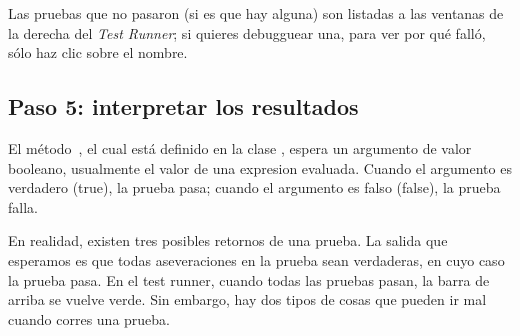 \documentclass[a4paper,10pt,twoside]{book}
\begin{document}




Las pruebas que no pasaron (si es que hay alguna) son listadas a las ventanas de la derecha del \emph{Test Runner};
si quieres debugguear una, para ver por qu\'e fall\'o, s\'olo haz clic sobre el nombre.


\subsection{Paso 5: interpretar los resultados}

El m\'etodo \,, el cual est\'a definido en la clase
, espera un argumento de valor booleano, usualmente el valor de 
una expresion evaluada. Cuando el argumento es verdadero (true), la prueba pasa;
cuando el argumento es falso (false), la prueba falla.

En realidad, existen tres posibles retornos de una prueba.
La salida que esperamos es que todas aseveraciones en la prueba sean verdaderas, en cuyo caso la prueba pasa.
En el test runner, cuando todas las pruebas pasan, la barra de arriba se vuelve verde.
Sin embargo, hay dos tipos de cosas que pueden ir mal cuando corres una prueba.
\end{document}
